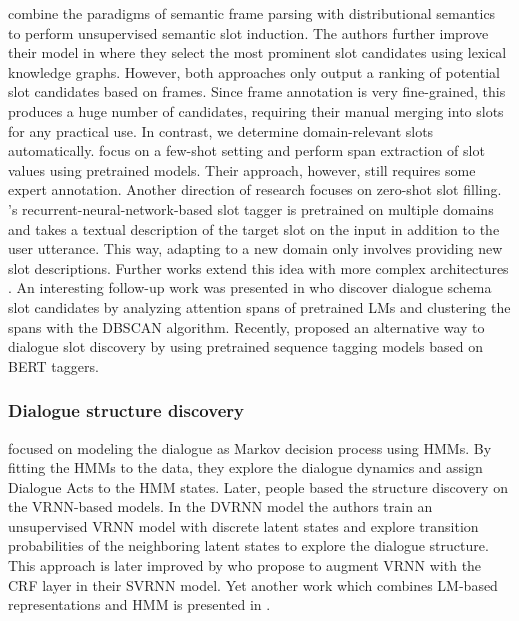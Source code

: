 \label{sec:relwork-chen}
\citet{chen2014leveraging} combine the paradigms of semantic frame parsing with distributional semantics to perform unsupervised semantic slot induction.
The authors further improve their model in \citet{chen2015jointly} where they select the most prominent slot candidates using lexical knowledge graphs.
However, both approaches only output a ranking of potential slot candidates based on frames.
Since frame annotation is very fine-grained, this produces a huge number of candidates, requiring their manual merging  %
into slots for any practical use.
In contrast, we determine domain-relevant slots automatically.
\citet{coope_span-convert_2020} focus on a few-shot setting and perform span extraction of slot values using pretrained models. Their approach, however, still requires some expert annotation.
Another direction of research focuses on zero-shot slot filling.  \citet{bapna2017towards}'s recurrent-neural-network-based slot tagger is pretrained on multiple domains and takes a textual description of the target slot on the input in addition to the user utterance. This way, adapting to a new domain only involves providing new slot descriptions.
Further works extend this idea with more complex architectures \cite{shah2019robust,liu2020coach}.
An interesting follow-up work was presented in \citet{yu-etal-2022-unsupervised} who discover dialogue schema slot candidates by analyzing attention spans of pretrained LMs and clustering the spans with the DBSCAN algorithm.
Recently, \citet{qiu2022structure} proposed an alternative way to dialogue slot discovery by using pretrained sequence tagging models based on BERT taggers.

\subsubsection{Dialogue structure discovery}
\citet{brychcin2016unsupervised} focused on modeling the dialogue as Markov decision process using HMMs.
By fitting the HMMs to the data, they explore the dialogue dynamics and assign Dialogue Acts to the HMM states.
Later, people based the structure discovery on the VRNN-based models.
In the DVRNN model \cite{shi2019unsupervised} the authors train an unsupervised VRNN model with discrete latent states and explore transition probabilities of the neighboring latent states to explore the dialogue structure.
This approach is later improved by \citet{qiu-etal-2020-structured} who propose to augment VRNN with the CRF layer in their SVRNN model.
Yet another work which combines LM-based representations and HMM is presented in \citet{lu-etal-2022-unsupervised}.

